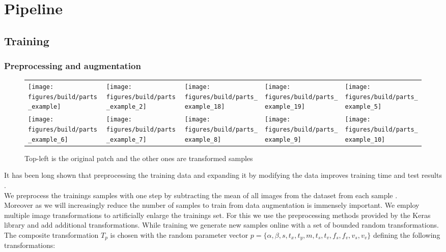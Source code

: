 %
\chapter{Pipeline}
\label{sec:pipeline}

\section{Training}
\label{sec:pipeline:training}
\subsection{Preprocessing and augmentation}
\label{sec:pipeline:training:augment}
\begin{figure}[htb]
    \begin{tabularx}{\textwidth}{XXXXX}
        \texttt{[image: figures/build/parts\_example]} &
        \texttt{[image: figures/build/parts\_example\_2]} &
        \texttt{[image: figures/build/parts\_example\_18]} &
        \texttt{[image: figures/build/parts\_example\_19]} &
        \texttt{[image: figures/build/parts\_example\_5]} \\

        \texttt{[image: figures/build/parts\_example\_6]} &
        \texttt{[image: figures/build/parts\_example\_7]} &
        \texttt{[image: figures/build/parts\_example\_8]} &
        \texttt{[image: figures/build/parts\_example\_9]} &
        \texttt{[image: figures/build/parts\_example\_10]}
    \end{tabularx}
	\caption{Top-left is the original patch and the other ones are transformed samples}
    \label{fig:augmentation}
\end{figure}
It has been long shown that preprocessing the training data and expanding it by modifying the data improves training time and test results \citep{dosovitskiy_discriminative_2014}.\\
We preprocess the trainings samples with one step by subtracting the mean of all images from the dataset from each sample \citep{krizhevsky_imagenet_2012}.\\
Moreover as we will increasingly reduce the number of samples to train from data augmentation is immensely important.  We employ multiple image transformations to artificially enlarge the trainings set. For this we use the preprocessing methods provided by the Keras library \citep{chollet_keras:_2015} and add additional transformations. While training we generate new samples online with a set of bounded random transformations. The composite transformation $T_p$ is chosen with the random parameter vector $p = \{\alpha, \beta, s, t_x, t_y, m, t_s, t_v, f_s, f_v, v_s, v_v\}$ defining the following transformations:
